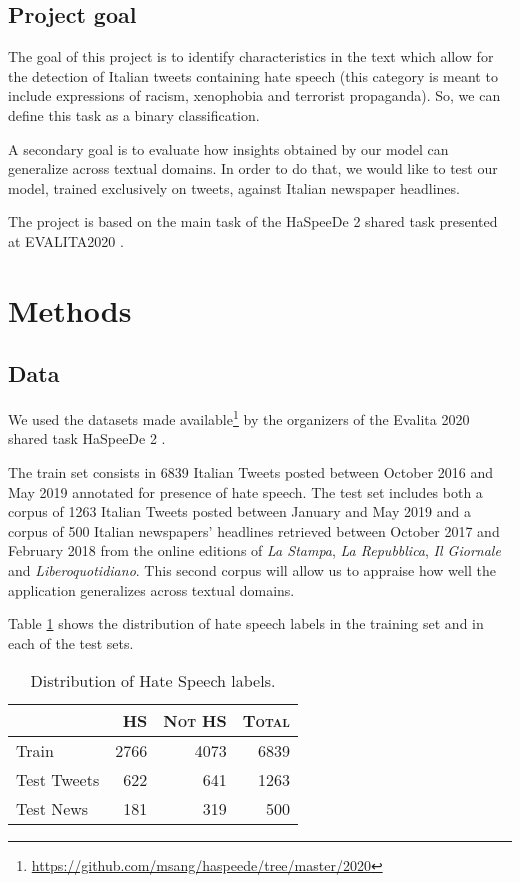 \documentclass[a4paper, 10pt, twocolumn, DIV=calc]{scrartcl}
\begin{document}
\subsection{Project goal}
The goal of this project is to identify characteristics in the text which allow for the detection of Italian tweets containing hate speech (this category is meant to include expressions of racism, xenophobia and terrorist propaganda).
So, we can define this task as a binary classification.

A secondary goal is to evaluate how insights obtained by our model can generalize across textual domains. In order to do that, we would like to test our model, trained exclusively on tweets, against Italian newspaper headlines.

The project is based on the main task of the HaSpeeDe 2 shared task presented at EVALITA2020 \cite{haspeede2}.

\section{Methods}
\subsection{Data}
We used the datasets made available\footnote{\url{https://github.com/msang/haspeede/tree/master/2020}} by the organizers of the Evalita 2020 shared task HaSpeeDe 2 \cite{haspeede2}.

The train set consists in 6839 Italian Tweets posted between October 2016 and May 2019 annotated for presence of hate speech.
The test set includes both a corpus of 1263 Italian Tweets posted between January and May 2019 and a corpus of 500 Italian newspapers' headlines retrieved between October 2017 and February 2018 from the online editions of \emph{La Stampa}, \emph{La Repubblica}, \emph{Il Giornale} and \emph{Liberoquotidiano}.
This second corpus will allow us to appraise how well the application generalizes across textual domains.

Table \ref{tbl:class_composition} shows the distribution of hate speech labels in the training set and in each of the test sets.

\begin{table}
\caption{Distribution of Hate Speech labels.}
    \begin{tabular}{lrrr}
        \toprule
        & \textsc{HS} & \textsc{Not HS} & \textsc{Total} \\
        \midrule
        Train & 2766 & 4073 & 6839 \\
        \midrule
        Test Tweets & 622 & 641 & 1263 \\
        Test News & 181 & 319 & 500 \\
        \bottomrule
    \end{tabular}
    \label{tbl:class_composition}
\end{table}
\end{document}
